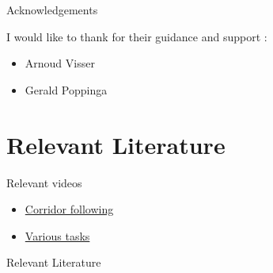 \documentclass{beamer}
\begin{document}
\begin{frame}{Acknowledgements}
\begin{block}{I would like to thank for their guidance and support
:}
\begin{itemize}
\item Arnoud Visser
\item Gerald Poppinga
\end{itemize}
\end{block}
\end{frame}

\section{Relevant Literature}
\begin{frame}{}
\begin{block}{Relevant videos}
\begin{itemize}
\item \href{http://youtu.be/7XyddRwP_KA}{Corridor following}
\item \href{http://youtu.be/MF0nHhMKl5g}{Various tasks}
\end{itemize}

\end{block}
\end{frame}


\begin{frame}[allowframebreaks]{Relevant Literature}
\footnotesize


\end{frame}
\end{document}
